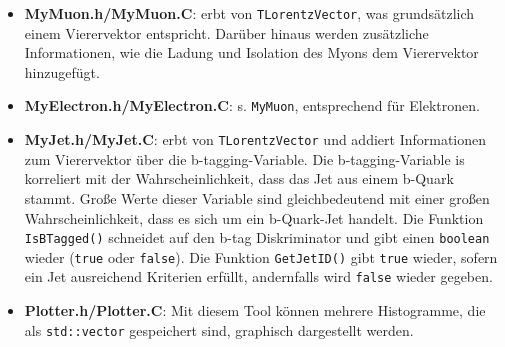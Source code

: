 \begin{itemize}
	\item \textbf{MyMuon.h/MyMuon.C}: erbt von \texttt{TLorentzVector}, was grunds\"atzlich einem Vierervektor entspricht. Dar\"uber hinaus werden zus\"atzliche Informationen, wie die Ladung und Isolation des Myons dem Vierervektor hinzugef\"ugt.
	\item \textbf{MyElectron.h/MyElectron.C}: s. \texttt{MyMuon}, entsprechend f\"ur Elektronen.
	\item \textbf{MyJet.h/MyJet.C}: erbt von \texttt{TLorentzVector} und addiert Informationen zum Vierervektor \"uber die b-tagging-Variable. Die b-tagging-Variable is korreliert mit der Wahrscheinlichkeit, dass das Jet aus einem b-Quark stammt. Gro\ss{}e Werte dieser Variable sind gleichbedeutend mit einer gro\ss{}en Wahrscheinlichkeit, dass es sich um ein b-Quark-Jet handelt. Die Funktion \texttt{IsBTagged()} schneidet auf den b-tag Diskriminator und gibt einen \texttt{boolean} wieder (\texttt{true} oder \texttt{false}). Die Funktion \texttt{GetJetID()} gibt \texttt{true} wieder, sofern ein Jet ausreichend Kriterien erf\"ullt, andernfalls wird \texttt{false} wieder gegeben.
	\item \textbf{Plotter.h/Plotter.C}: Mit diesem Tool k\"onnen mehrere Histogramme, die als \texttt{std::vector} gespeichert sind, graphisch dargestellt werden.
\end{itemize}
